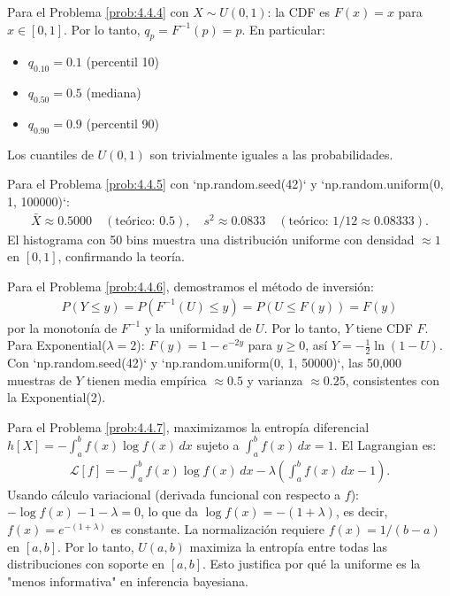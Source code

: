 \begin{solucion}
	\label{sol:4.4.4}
	Para el Problema \ref{prob:4.4.4} con $X \sim U(0, 1)$: la CDF es $F(x) = x$ para $x \in [0, 1]$. Por lo tanto, $q_{p} = F^{-1}(p) = p$. En particular:
	\begin{itemize}
		\item $q_{0.10} = 0.1$ (percentil 10)
		\item $q_{0.50} = 0.5$ (mediana)
		\item $q_{0.90} = 0.9$ (percentil 90)
	\end{itemize}
	Los cuantiles de $U(0, 1)$ son trivialmente iguales a las probabilidades.
\end{solucion}

\begin{solucion}
	\label{sol:4.4.5}
	Para el Problema \ref{prob:4.4.5} con `np.random.seed(42)` y `np.random.uniform(0, 1, 100000)`:
	\begin{align*}
		\bar{X} \approx 0.5000 \quad (\text{teórico: } 0.5), \quad s^{2} \approx 0.0833 \quad (\text{teórico: } 1/12 \approx 0.08333).
	\end{align*}
	El histograma con 50 bins muestra una distribución uniforme con densidad $\approx 1$ en $[0, 1]$, confirmando la teoría.
\end{solucion}

\begin{solucion}
	\label{sol:4.4.6}
	Para el Problema \ref{prob:4.4.6}, demostramos el método de inversión:
	\begin{align*}
		P(Y \le y) = P(F^{-1}(U) \le y) = P(U \le F(y)) = F(y)
	\end{align*}
	por la monotonía de $F^{-1}$ y la uniformidad de $U$. Por lo tanto, $Y$ tiene CDF $F$. Para Exponential($\lambda = 2$): $F(y) = 1 - e^{-2y}$ para $y \ge 0$, así $Y = -\frac{1}{2}\ln(1-U)$. Con `np.random.seed(42)` y `np.random.uniform(0, 1, 50000)`, las 50{,}000 muestras de $Y$ tienen media empírica $\approx 0.5$ y varianza $\approx 0.25$, consistentes con la Exponential(2).
\end{solucion}

\begin{solucion}
	\label{sol:4.4.7}
	Para el Problema \ref{prob:4.4.7}, maximizamos la entropía diferencial $h[X] = -\int_{a}^{b} f(x) \log f(x)\,dx$ sujeto a $\int_{a}^{b} f(x)\,dx = 1$. El Lagrangian es:
	\begin{align*}
		\mathcal{L}[f] = -\int_{a}^{b} f(x) \log f(x)\,dx - \lambda \left( \int_{a}^{b} f(x)\,dx - 1 \right).
	\end{align*}
	Usando cálculo variacional (derivada funcional con respecto a $f$): $-\log f(x) - 1 - \lambda = 0$, lo que da $\log f(x) = -(1 + \lambda)$, es decir, $f(x) = e^{-(1+\lambda)}$ es constante. La normalización requiere $f(x) = 1/(b-a)$ en $[a, b]$. Por lo tanto, $U(a, b)$ maximiza la entropía entre todas las distribuciones con soporte en $[a, b]$. Esto justifica por qué la uniforme es la "menos informativa" en inferencia bayesiana. \quad \qedhere
\end{solucion}

